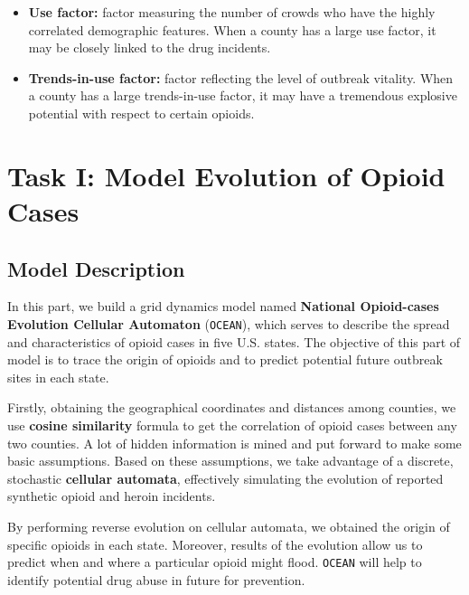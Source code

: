 \documentclass[a4paper]{article}
\begin{document}
\begin{itemize}
  \item \textbf{Use factor:} factor measuring the number of crowds who have the highly correlated demographic features. When a county has a large use factor, it may be closely linked to the drug incidents.
  \vspace{4pt}
  
  \item \textbf{Trends-in-use factor:} factor reflecting the level of outbreak vitality. When a county has a large trends-in-use factor, it may have a tremendous explosive potential with respect to certain opioids.
  \vspace{4pt}
  
\end{itemize}


\section{\textbf{Task I}: Model Evolution of Opioid Cases}

\subsection{Model Description}

In this part, we build a grid dynamics model named \textbf{National Opioid-cases Evolution Cellular Automaton} (\texttt{OCEAN}), which serves to describe the spread and characteristics of opioid cases in five U.S. states. The objective of this part of model is to trace the origin of opioids and to predict potential future outbreak sites in each state.

Firstly, obtaining the geographical coordinates and distances among counties, we use \textbf{cosine similarity} formula to get the correlation of opioid cases between any two counties. A lot of hidden information is mined and put forward to make some basic assumptions. Based on these assumptions, we take advantage of a discrete, stochastic \textbf{cellular automata}, effectively simulating the evolution of reported synthetic opioid and heroin incidents.

By performing reverse evolution on cellular automata, we obtained the origin of specific opioids in each state. Moreover, results of the evolution allow us to predict when and where a particular opioid might flood. \texttt{OCEAN} will help to identify potential drug abuse in future for prevention.
\end{document}
